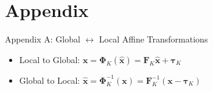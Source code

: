 \documentclass[xcolor=pdftex,table,10pt,yellow,mathserif]{beamer}
\begin{document}
\section*{Appendix}

\begin{frame}{Appendix A: Global $\leftrightarrow$ Local Affine Transformations}

    \begin{itemize}
        \item Local to Global: $\boldsymbol{x} = \mathbf{\Phi}_K(\hat{\boldsymbol{x}}) = \mathbf{F}_K \hat{\boldsymbol{x}} + \boldsymbol{\tau}_K$
        \item Global to Local: $\hat{\boldsymbol{x}} = \mathbf{\Phi}_K^{-1}(\boldsymbol{x}) = \mathbf{F}_K^{-1} (\boldsymbol{x} - \boldsymbol{\tau}_K)$
    \end{itemize}
    
\end{frame}
\end{document}
